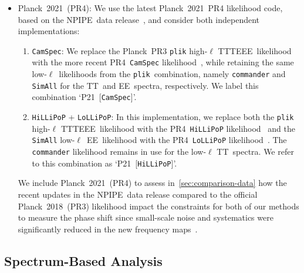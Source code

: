 \documentclass[11pt]{article}
\numberwithin{equation}{section}
\begin{document}
\begin{itemize}
	\item Planck~2021~(PR4): We use the latest Planck~2021~PR4 likelihood code, based on the NPIPE~data release~\cite{Planck:2020olo}, and consider both independent implementations:
	\begin{enumerate}
		\item \texttt{CamSpec}: We replace the Planck~PR3 \texttt{plik} \mbox{high-$\ell$} TTTEEE~likelihood with the more recent PR4~\texttt{CamSpec} likelihood~\cite{Efstathiou:2019mdh, Rosenberg:2022sdy}, while retaining the same \mbox{low-$\ell$}~likelihoods from the \texttt{plik}~combination, namely \texttt{commander} and \texttt{SimAll} for the TT~and EE~spectra, respectively. We label this combination `P21~[\texttt{CamSpec}]'.
		\item \texttt{HiLLiPoP} + \texttt{LoLLiPoP}: In this implementation, we replace both the \texttt{plik} \mbox{high-$\ell$} TTTEEE~likelihood with the PR4~\texttt{HiLLiPoP} likelihood~\cite{Tristram:2020wbi,Tristram:2023haj} and the \texttt{SimAll} \mbox{low-$\ell$}~EE~likelihood with the PR4~\texttt{LoLLiPoP} likelihood~\cite{Tristram:2020wbi,Tristram:2023haj}. The \texttt{commander} likelihood remains in use for the low-$\ell$ TT~spectra. We refer to this combination as `P21~[\texttt{HiLLiPoP}]'.
	\end{enumerate}
	We include Planck~2021~(PR4) to assess in~\textsection\ref{sec:comparison-data} how the recent updates in the NPIPE~data release compared to the official Planck~2018~(PR3) likelihood impact the constraints for both of our methods to measure the phase shift since small-scale noise and systematics were significantly reduced in the new frequency maps~\cite{Planck:2020olo, Rosenberg:2022sdy, Tristram:2023haj}.
\end{itemize}


\subsection{Spectrum-Based Analysis}
\label{sec:spectrum-analysis}
\end{document}
